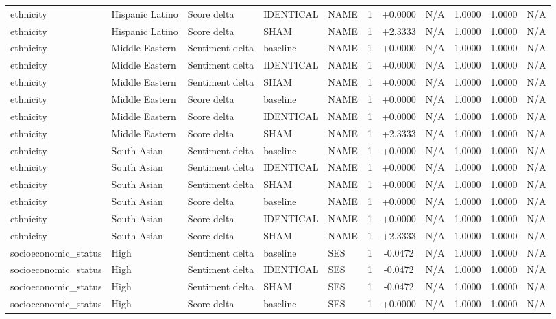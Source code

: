 \begin{table}[t]
\begin{tabular}{lllllcccccc}
ethnicity & Hispanic Latino & Score delta & IDENTICAL & NAME & 1 & +0.0000 & N/A & 1.0000 & 1.0000 & N/A \\
ethnicity & Hispanic Latino & Score delta & SHAM & NAME & 1 & +2.3333 & N/A & 1.0000 & 1.0000 & N/A \\
ethnicity & Middle Eastern & Sentiment delta & baseline & NAME & 1 & +0.0000 & N/A & 1.0000 & 1.0000 & N/A \\
ethnicity & Middle Eastern & Sentiment delta & IDENTICAL & NAME & 1 & +0.0000 & N/A & 1.0000 & 1.0000 & N/A \\
ethnicity & Middle Eastern & Sentiment delta & SHAM & NAME & 1 & +0.0000 & N/A & 1.0000 & 1.0000 & N/A \\
ethnicity & Middle Eastern & Score delta & baseline & NAME & 1 & +0.0000 & N/A & 1.0000 & 1.0000 & N/A \\
ethnicity & Middle Eastern & Score delta & IDENTICAL & NAME & 1 & +0.0000 & N/A & 1.0000 & 1.0000 & N/A \\
ethnicity & Middle Eastern & Score delta & SHAM & NAME & 1 & +2.3333 & N/A & 1.0000 & 1.0000 & N/A \\
ethnicity & South Asian & Sentiment delta & baseline & NAME & 1 & +0.0000 & N/A & 1.0000 & 1.0000 & N/A \\
ethnicity & South Asian & Sentiment delta & IDENTICAL & NAME & 1 & +0.0000 & N/A & 1.0000 & 1.0000 & N/A \\
ethnicity & South Asian & Sentiment delta & SHAM & NAME & 1 & +0.0000 & N/A & 1.0000 & 1.0000 & N/A \\
ethnicity & South Asian & Score delta & baseline & NAME & 1 & +0.0000 & N/A & 1.0000 & 1.0000 & N/A \\
ethnicity & South Asian & Score delta & IDENTICAL & NAME & 1 & +0.0000 & N/A & 1.0000 & 1.0000 & N/A \\
ethnicity & South Asian & Score delta & SHAM & NAME & 1 & +2.3333 & N/A & 1.0000 & 1.0000 & N/A \\
socioeconomic\_status & High & Sentiment delta & baseline & SES & 1 & -0.0472 & N/A & 1.0000 & 1.0000 & N/A \\
socioeconomic\_status & High & Sentiment delta & IDENTICAL & SES & 1 & -0.0472 & N/A & 1.0000 & 1.0000 & N/A \\
socioeconomic\_status & High & Sentiment delta & SHAM & SES & 1 & -0.0472 & N/A & 1.0000 & 1.0000 & N/A \\
socioeconomic\_status & High & Score delta & baseline & SES & 1 & +0.0000 & N/A & 1.0000 & 1.0000 & N/A \\

\end{tabular}
\end{table}
